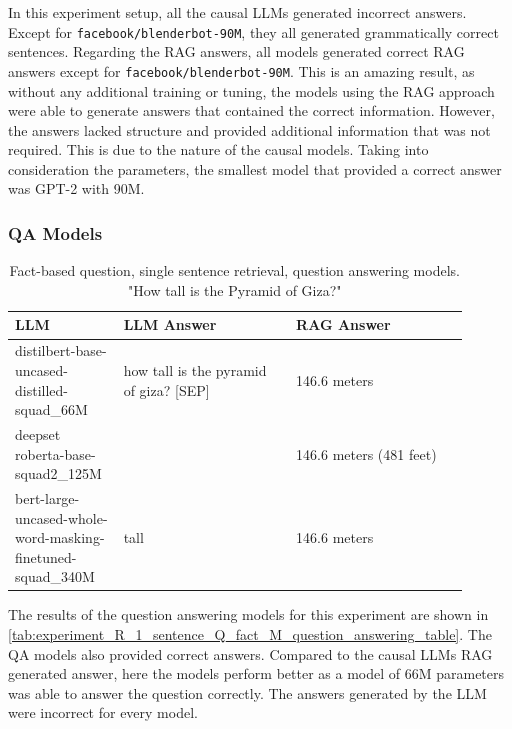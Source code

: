 \documentclass{wseas}
\begin{document}
In this experiment setup, all the causal LLMs generated incorrect answers. 
Except for \texttt{facebook/blenderbot-90M}, they all generated grammatically correct sentences. 
Regarding the RAG answers, all models generated correct RAG answers except for \texttt{facebook/blenderbot-90M}.
This is an amazing result, as without any additional training or tuning, the models
using the RAG approach were able to generate answers that contained the correct information.
However, the answers lacked structure and provided additional information that was not required. 
This is due to the nature of the causal models. Taking into consideration the parameters,
the smallest model that provided a correct answer was GPT-2 with 90M.
\subsubsection{QA Models}

\begin{table}[htbp]
  \centering
  \caption{Fact-based question, single sentence retrieval, question answering models. "How tall is the Pyramid of Giza?"} %
  \label{tab:experiment_R_1_sentence_Q_fact_M_question_answering_table}  %
    \begin{tabular}{|p{0.2\linewidth}|p{0.35\linewidth}|p{0.35\linewidth}|}
      \hline
      \textbf{LLM} & \textbf{LLM Answer} & \textbf{RAG Answer} \\ \hline
      distilbert-base-uncased-distilled-squad\_66M & how tall is the pyramid of giza? {[}SEP{]} & 146.6 meters \\ \hline
      deepset roberta-base-squad2\_125M &  & 146.6 meters (481 feet) \\ \hline
      bert-large-uncased-whole-word-masking-finetuned-squad\_340M & tall & 146.6 meters \\ \hline
    \end{tabular}
\end{table}
The results of the question answering models for this experiment
are shown in \autoref{tab:experiment_R_1_sentence_Q_fact_M_question_answering_table}.
The QA models also provided correct answers. Compared to the causal LLMs
RAG generated answer, here the models perform better as a model of 66M parameters
was able to answer the question correctly. The answers generated by the LLM were incorrect for every model.
\end{document}
